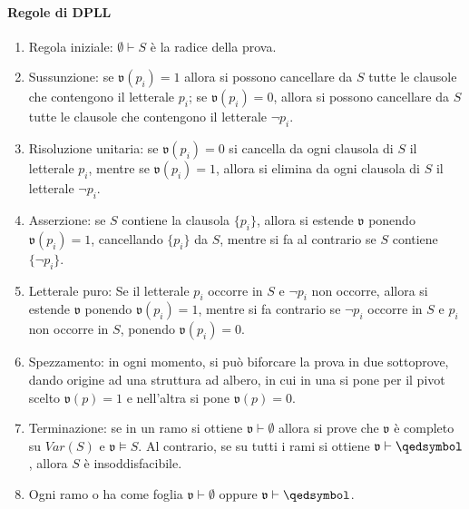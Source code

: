 \paragraph{Regole di DPLL}
\begin{enumerate}
        \item Regola iniziale: $\emptyset \vdash S$ è la radice della prova. 
        \item Sussunzione: se $\mathfrak{v}(p_i) = 1$ allora si possono cancellare 
                da $S$ tutte le clausole che contengono  il letterale $p_i$; 
                se $\mathfrak{v}(p_i) = 0$, allora si possono cancellare 
                da $S$ tutte le clausole che contengono il letterale $\neg p_i$. 
        \item Risoluzione unitaria: se $\mathfrak{v}(p_i) = 0$ si cancella 
                da ogni clausola di $S$ il letterale $p_i$, mentre se $\mathfrak{v}(p_i) = 1$, 
                allora si elimina da ogni clausola di $S$ il letterale $\neg p_i$. 
        \item Asserzione: se $S$ contiene la clausola $\{p_i\}$, allora 
                si estende $\mathfrak{v}$ ponendo $\mathfrak{v}(p_i) = 1$, 
                cancellando $\{p_i\}$ da $S$, mentre si fa al contrario
                se $S$ contiene $\{\neg p_i\}$.
        \item Letterale puro: Se il letterale $p_i$ occorre in $S$ e $\neg p_i$ non 
                occorre, allora si estende $\mathfrak{v}$ ponendo $\mathfrak{v}(p_i) = 1$, 
                mentre si fa contrario se $\neg p_i$ occorre in $S$ e $p_i$ 
                non occorre in $S$, ponendo $\mathfrak{v}(p_i) = 0$. 
        \item Spezzamento: in ogni momento, si può biforcare la prova in due 
                sottoprove, dando origine ad una struttura ad albero, in cui 
                in una si pone per il pivot scelto $\mathfrak{v}(p) = 1$ 
                e nell'altra si pone $\mathfrak{v}(p)= 0$. 
        \item Terminazione: se in un ramo si ottiene $\mathfrak{v} \vdash \emptyset$ 
                allora si prove che $\mathfrak{v}$ è completo su 
                $Var(S)$ e $\mathfrak{v} \models S$. Al contrario, se su tutti 
                i rami si ottiene $\mathfrak{v} \vdash \qedsymbol$, 
                allora $S$ è insoddisfacibile. 
        \item Ogni ramo o ha come foglia $\mathfrak{v} \vdash \emptyset$ 
                oppure $\mathfrak{v} \vdash \qedsymbol$.
\end{enumerate}
